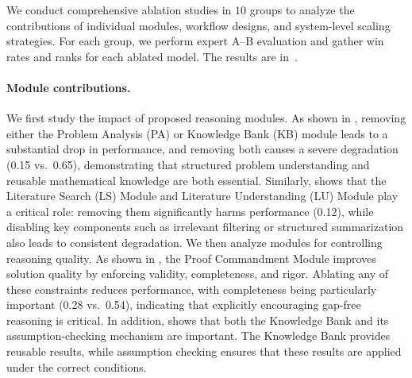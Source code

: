 \documentclass{article}
\begin{document}
We conduct comprehensive ablation studies in $10$ groups to analyze the contributions of individual modules, workflow designs, and system-level scaling strategies. For each group, we perform expert A--B evaluation and gather win rates and ranks for each ablated model. The results are in~.
\vspace{-7pt}
\paragraph{Module contributions.}
We first study the impact of proposed reasoning modules. As shown in , removing either the Problem Analysis (PA) or Knowledge Bank (KB) module leads to a substantial drop in performance, and removing both causes a severe degradation (0.15 vs.\ 0.65), demonstrating that structured problem understanding and reusable mathematical knowledge are both essential. Similarly,  shows that the Literature Search (LS) Module and Literature Understanding (LU) Module play a critical role: removing them significantly harms performance (0.12), while disabling key components such as irrelevant filtering or structured summarization also leads to consistent degradation. We then analyze modules for controlling reasoning quality. As shown in , the Proof Commandment Module improves solution quality by enforcing validity, completeness, and rigor. Ablating any of these constraints reduces performance, with completeness being particularly important (0.28 vs.\ 0.54), indicating that explicitly encouraging gap-free reasoning is critical. In addition,  shows that both the Knowledge Bank and its assumption-checking mechanism are important. The Knowledge Bank provides reusable results, while assumption checking ensures that these results are applied under the correct conditions. 


\vspace{-7pt}
\end{document}
